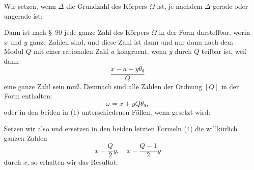 

Wir setzen, wenn $\Delta$ die Grundzahl des Körpers $\Omega$ ist, je nachdem $\Delta$ gerade oder ungerade ist:

Dann ist nach \S\ 90 jede ganze Zahl des Körpers $\Omega$ in der Form
darstellbar, worin $x$ und $y$ ganze Zahlen sind, und diese Zahl ist dann und nur dann nach dem Modul $Q$ mit einer rationalen Zahl $a$ kongruent, wenn $y$ durch $Q$ teilbar ist, weil dann
\[
\frac{x - a + y\theta_0}{Q}
\]
eine ganze Zahl sein muß. Demnach sind alle Zahlen der Ordnung $[Q]$ in der Form enthalten:
\[
\omega = x + yQ\theta_0,
\]
oder in den beiden in (1) unterschiedenen Fällen, wenn
gesetzt wird:

Setzen wir also
und ersetzen in den beiden letzten Formeln (4) die willkürlich ganzen Zahlen
\[
x - \frac{Q}{2}y, \quad x - \frac{Q-1}{2}y
\]
durch $x$, so erhalten wir das Resultat:
